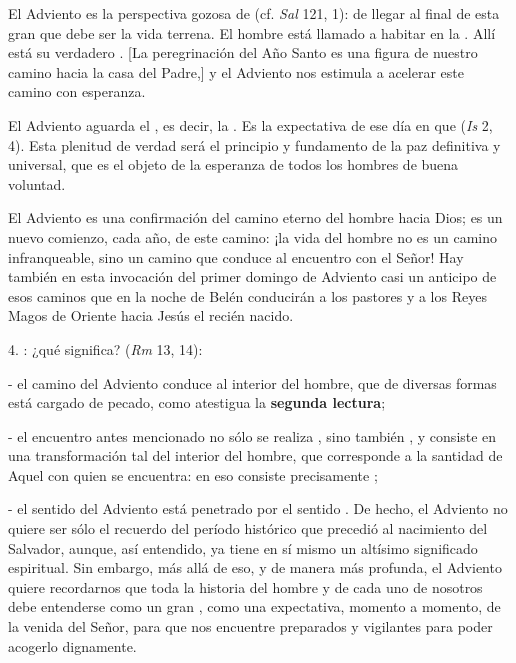 \begin{body}
	El Adviento es la perspectiva gozosa de  (cf. \emph{Sal} 121, 1): de llegar al final de esta gran  que debe ser la vida terrena. El hombre está llamado a habitar en la . Allí está su verdadero . {[}La peregrinación del Año Santo es una figura de nuestro camino hacia la casa del Padre,{]} y el Adviento nos estimula a acelerar este camino con esperanza.
	
	El Adviento aguarda el , es decir, la . Es la expectativa de ese día en que  (\emph{Is} 2, 4). Esta plenitud de verdad será el principio y fundamento de la paz definitiva y universal, que es el objeto de la esperanza de todos los hombres de buena voluntad.
	
	El Adviento es una confirmación del camino eterno del hombre hacia Dios; es un nuevo comienzo, cada año, de este camino: ¡la vida del hombre no es un camino infranqueable, sino un camino que conduce al encuentro con el Señor! Hay también en esta invocación del primer domingo de Adviento casi un anticipo de esos caminos que en la noche de Belén conducirán a los pastores y a los Reyes Magos de Oriente hacia Jesús el recién nacido.
	
	4. : ¿qué significa?  (\emph{Rm} 13, 14):
	
	- el camino del Adviento conduce al interior del hombre, que de diversas formas está cargado de pecado, como atestigua la \textbf{segunda lectura};
	
	- el encuentro antes mencionado no sólo se realiza , sino también , y consiste en una transformación tal del interior del hombre, que corresponde a la santidad de Aquel con quien se encuentra: en eso consiste precisamente ;
	
	- el sentido  del Adviento está penetrado por el sentido . De hecho, el Adviento no quiere ser sólo el recuerdo del período histórico que precedió al nacimiento del Salvador, aunque, así entendido, ya tiene en sí mismo un altísimo significado espiritual. Sin embargo, más allá de eso, y de manera más profunda, el Adviento quiere recordarnos que toda la historia del hombre y de cada uno de nosotros debe entenderse como un gran , como una expectativa, momento a momento, de la venida del Señor, para que nos encuentre preparados y vigilantes para poder acogerlo dignamente.
	

\end{body}
